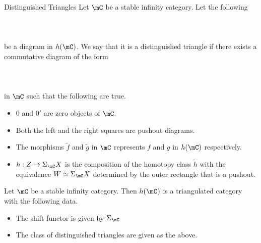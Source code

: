 \documentclass[a4paper]{article}
\begin{document}
\begin{defn}{Distinguished Triangles}{} Let $\mC$ be a stable infinity category. Let the following \\~\\
\\~\\
be a diagram in $h(\mC)$. We say that it is a distinguished triangle if there exists a commutative diagram of the form \\~\\
\\~\\
in $\mC$ such that the following are true. 
\begin{itemize}
\item $0$ and $0'$ are zero objects of $\mC$. 
\item Both the left and the right squares are pushout diagrams. 
\item The morphisms $\widetilde{f}$ and $\widetilde{g}$ in $\mC$ represents $f$ and $g$ in $h(\mC)$ respectively. 
\item $h:Z\to\Sigma_\mC X$ is the composition of the homotopy class $\widetilde{h}$ with the equivalence $W\simeq\Sigma_\mC X$ determined by the outer rectangle that is a pushout. 
\end{itemize}
\end{defn}

\begin{prp}{}{} Let $\mC$ be a stable infinity category. Then $h(\mC)$ is a triangulated category with the following data. 
\begin{itemize}
\item The shift functor is given by $\Sigma_\mC$
\item The class of distinguished triangles are given as the above. 
\end{itemize}
\end{prp}
\end{document}
